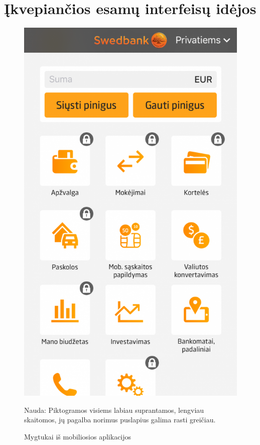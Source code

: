 \documentclass{VUMIFPSkursinis}
\begin{document}
\section{Įkvepiančios esamų interfeisų idėjos}
\begin{figure}[!htb]
	\begin{center}
	\includegraphics[scale=0.4]{mobileApp.png}
	\end{center}
  \caption{Mygtukai iš mobiliosios aplikacijos}
	\label{fig:mobileApp}
	Nauda: Piktogramos visiems labiau suprantamos, lengviau skaitomos, jų pagalba norimus puslapius galima rasti greičiau.
\end{figure}
\end{document}
